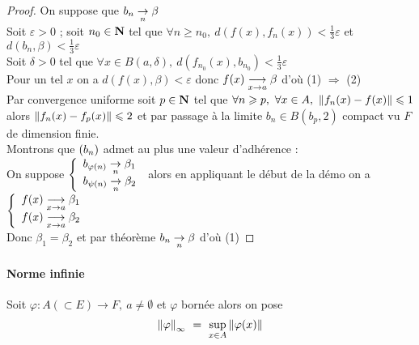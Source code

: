     \begin{proof}
        On suppose que $b_n \underset{n}{\rightarrow} \beta$ \\ Soit $\varepsilon >0$ ; soit $n_0\in {\mathbf{N}}$ tel que $\forall n\geqslant n_0 ,~d(f(x),f_n(x) ) <\frac{1}{3}
        \varepsilon$ et $d(b_n ,\beta )< \frac{1}{3}\varepsilon$ \\ Soit $\delta >0$ tel que $\forall x\in B(a,\delta ) ,~d(f_{n_0}(x) , 
        b_{n_0})<\frac{1}{3}\varepsilon$ \\ Pour un tel $x$ on a $d(f(x),\beta ) <\varepsilon$ donc $f(x) \underset{x \to a}{\longrightarrow} \beta$ d'où {\tiny (1)} $
        \Rightarrow$ {\tiny (2)} \vspace*{0.3cm} \\ Par convergence uniforme soit $p\in{\mathbf{N}}$ tel que $\forall n\geqslant p ,~\forall x\in A 
        ,~\left\Vert f_n(x)-f(x) \right\Vert\leqslant 1$ \\alors $\left\Vert f_n(x)-f_p(x) \right\Vert \leqslant 2$ et par passage à la limite $b_n\in B(b_p ,2)$ compact vu $F$ de dimension 
        finie. \\Montrons que $(b_n)$ admet au plus une valeur d'adhérence : 
        \\On suppose $\left\{ \begin{array}{l} b_{\varphi (n)} \underset{n}{\rightarrow} \beta_1 \\ b_{\psi (n)} \underset{n}{\rightarrow} \beta_2 \end{array} \right.$ alors en appliquant le début de la 
        démo on a $\left\{\begin{array}{l} f(x) \underset{x \to a}{\longrightarrow} \beta_1 \\ f(x) \underset{x \to a}{\longrightarrow} \beta_2 \end{array} \right.$ \\ Donc $\beta_1 = \beta_2$ et par théorème 
        $b_n \underset{n}{\rightarrow} \beta$ d'où {\tiny (1)}
    \end{proof}

    \traitd
    \paragraph{Norme infinie}
        Soit $\varphi :A (\subset E) \rightarrow F ,~a\neq\emptyset$ et $\varphi$ bornée alors on pose 
        \[\left\Vert \varphi \right\Vert_{\infty} ~=~ \underset{x\in A}{\mathrm{sup}} \left\Vert \varphi (x)  \right\Vert\] 
    \trait
    

